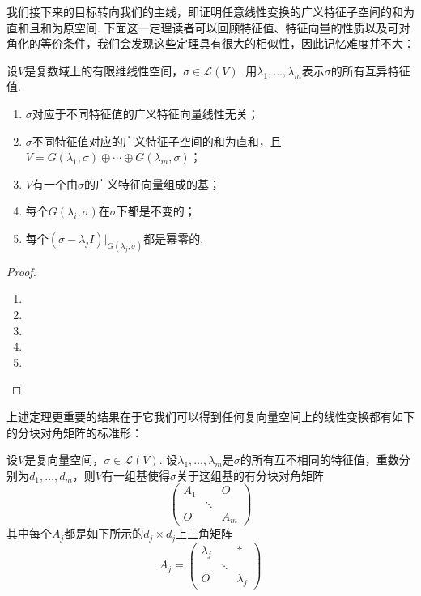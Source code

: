 我们接下来的目标转向我们的主线，即证明任意线性变换的广义特征子空间的和为直和且和为原空间. 下面这一定理读者可以回顾特征值、特征向量的性质以及可对角化的等价条件，我们会发现这些定理具有很大的相似性，因此记忆难度并不大：
\begin{theorem} \label{thm:17:广义特征性质}
    设$V$是复数域上的有限维线性空间，$\sigma\in \mathcal{L}(V)$. 用$\lambda_1,\ldots,\lambda_m$表示$\sigma$的所有互异特征值.
    \begin{enumerate}[label=(\arabic*)]
        \item $\sigma$对应于不同特征值的广义特征向量线性无关；

        \item \label{item:17:广义特征性质:2}
              $\sigma$不同特征值对应的广义特征子空间的和为直和，且$V=G(\lambda_1,\sigma)\oplus\cdots\oplus
                  G(\lambda_m,\sigma)$；

        \item $V$有一个由$\sigma$的广义特征向量组成的基；

        \item 每个$G(\lambda_i,\sigma)$在$\sigma$下都是不变的；

        \item \label{item:17:广义特征性质:5}
              每个$(\sigma-\lambda_j I)\vert_{G(\lambda_j,\sigma)}$都是幂零的.
    \end{enumerate}
\end{theorem}

\begin{proof}
    \begin{enumerate}
        \item

        \item

        \item

        \item

        \item
    \end{enumerate}
\end{proof}

上述定理更重要的结果在于它我们可以得到任何复向量空间上的线性变换都有如下的分块对角矩阵的标准形：
\begin{theorem} \label{thm:17:分块对角矩阵}
    设$V$是复向量空间，$\sigma\in \mathcal{L}(V)$. 设$\lambda_1,\ldots,\lambda_m$是$\sigma$的所有互不相同的特征值，重数分别为$d_1,\ldots,d_m$，则$V$有一组基使得$\sigma$关于这组基的有分块对角矩阵
    \[\begin{pmatrix}
            A_1 &  & O \\  & \ddots &  \\ O &  & A_m
        \end{pmatrix}\]
    其中每个$A_j$都是如下所示的$d_j\times d_j$上三角矩阵
    \[A_j=\begin{pmatrix}
            \lambda_j &  & * \\  & \ddots &  \\ O &  & \lambda_j
        \end{pmatrix}\]
\end{theorem}

